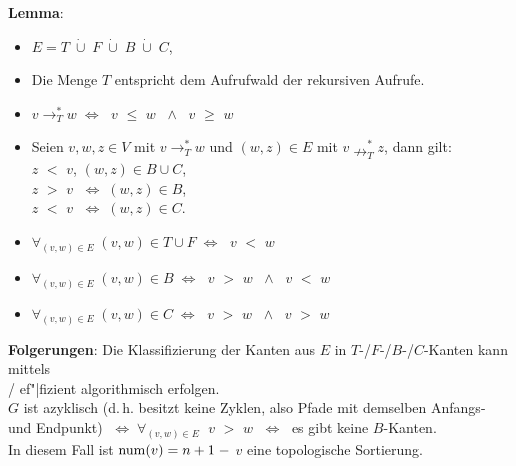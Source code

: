 \textbf{Lemma}:
\begin{itemize}
    \item
    $E = T \;\dot{\cup}\; F \;\dot{\cup}\; B \;\dot{\cup}\; C$,

    \item
    Die Menge $T$ entspricht dem Aufrufwald der rekursiven Aufrufe.

    \item
    $v \rightarrow^\ast_T w \;\Leftrightarrow\;$
    \code{dfsnum[}$v$\code{]} $\le$ \code{dfsnum[}$w$\code{]} $\;\land\;$
    \code{compnum[}$v$\code{]} $\ge$ \code{compnum[}$w$\code{]}

    \item
    Seien $v, w, z \in V$ mit $v \rightarrow^\ast_T w$ und
    $(w, z) \in E$ mit $v \nrightarrow^\ast_T z$, dann gilt: \\
    \code{dfsnum[}$z$\code{]} $<$ \code{dfsnum[}$v$\code{]}, \qquad
    $(w, z) \in B \cup C$, \\
    \code{compnum[}$z$\code{]} $>$ \code{compnum[}$v$\code{]}
    $\;\Leftrightarrow\; (w, z) \in B$, \\
    \code{compnum[}$z$\code{]} $<$ \code{compnum[}$v$\code{]}
    $\;\Leftrightarrow\; (w, z) \in C$.

    \item
    $\forall_{(v, w) \in E}\; (v, w) \in T \cup F \;\Leftrightarrow\;$
    \code{dfsnum[}$v$\code{]} $<$ \code{dfsnum[}$w$\code{]}

    \item
    $\forall_{(v, w) \in E}\; (v, w) \in B \;\Leftrightarrow\;$
    \code{dfsnum[}$v$\code{]} $>$ \code{dfsnum[}$w$\code{]} $\;\land\;$
    \code{compnum[}$v$\code{]} $<$ \code{compnum[}$w$\code{]}

    \item
    $\forall_{(v, w) \in E}\; (v, w) \in C \;\Leftrightarrow\;$
    \code{dfsnum[}$v$\code{]} $>$ \code{dfsnum[}$w$\code{]} $\;\land\;$
    \code{compnum[}$v$\code{]} $>$ \code{compnum[}$w$\code{]}
\end{itemize}

\linie

\textbf{Folgerungen}:
Die Klassifizierung der Kanten aus $E$ in $T$-/$F$-/$B$-/$C$-Kanten kann
mittels \\
/ ef"|fizient algorithmisch erfolgen. \\
$G$ ist azyklisch
(d.\,h. besitzt keine Zyklen, also Pfade mit demselben Anfangs- und Endpunkt)
$\;\Leftrightarrow\; \forall_{(v,w) \in E}\;$
\code{compnum[}$v$\code{]} $>$ \code{compnum[}$w$\code{]}
$\;\Leftrightarrow\;$ es gibt keine $B$-Kanten. \\
In diesem Fall ist $\operatorname{num}(v) = n + 1 \;-$ \code{compnum[}$v$\code{]}
eine topologische Sortierung.

